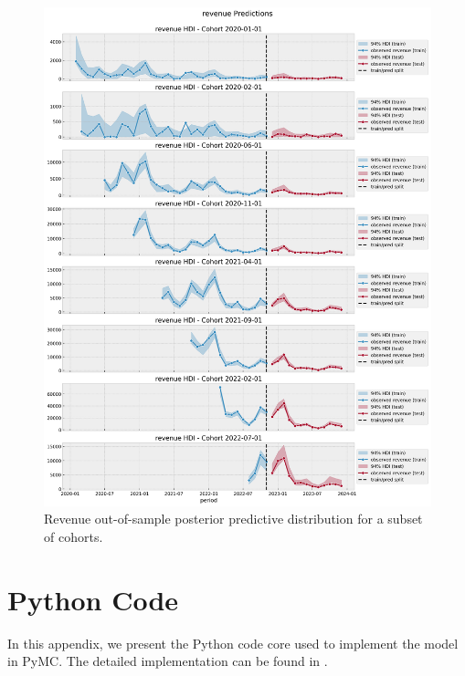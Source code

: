 \documentclass[11pt]{amsart}
\theoremstyle{definition}
\begin{document}
\begin{figure}
    \centering
    \includegraphics[width=\textwidth]{images/revenue_retention_68_0.png}
    \caption{Revenue out-of-sample posterior predictive distribution for a subset of
    cohorts.}
    \label{fig:out_sample_revenue}
\end{figure}

\clearpage

\appendix

\section{Python Code}\label{sec:appendix}

In this appendix, we present the Python code core used to implement the model in PyMC. 
The detailed implementation can be found in \cite{orduz_revenue_retention_data}.
\end{document}
